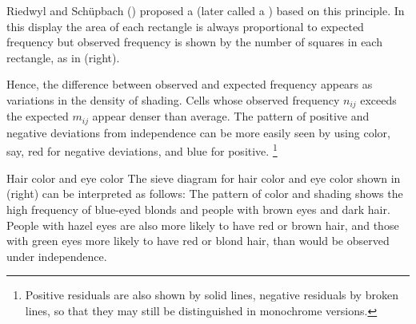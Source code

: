 \documentclass[10pt,krantz2]{krantz}\usepackage[]{graphicx}\usepackage[]{color}
\begin{document}
Riedwyl and Sch\"{u}pbach (\citeyear{RiedwylSchupbach:83,RiedwylSchupbach:94})
proposed a
(later called a ) based on
this principle.  In this display the area of each rectangle is
always proportional to expected frequency
but observed frequency is shown by
the number of squares in each rectangle,
as in  (right).

Hence, the difference
between observed and expected frequency appears as variations in the density of
shading.
Cells whose observed frequency $n_{ij}$ exceeds the expected $m_{ij}$
appear denser than average.
The pattern of positive and negative deviations from independence
can be more easily seen by
using color, say, red for negative deviations, and blue for positive.%
\footnote{
Positive residuals are also shown by solid lines, negative residuals by broken
lines, so that they may still be distinguished in monochrome versions.}

\begin{Example}[haireye2]{Hair color and eye color}
The sieve diagram for hair color and eye color
shown in
 (right) can be interpreted as follows:
The pattern of color and shading shows the high frequency of
blue-eyed blonds and people with brown eyes and dark hair.
People with hazel eyes are also more likely to have red or brown hair,
and those with green eyes more likely to have red or blond hair,
than would be observed under independence.
\end{Example}
\end{document}
